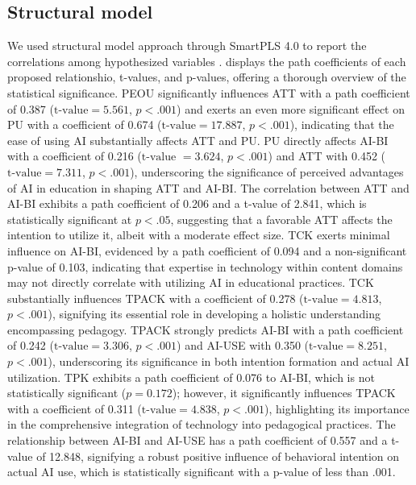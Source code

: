 \documentclass[english]{textolivre}
\begin{document}
\subsection{Structural model}\label{sec-outras-estr}
We used structural model approach through SmartPLS 4.0 to report the correlations among hypothesized variables \cite{cepeda2024plssem,hair2024plssem}.  displays the path coefficients of each proposed relationshio, t-values, and p-values, offering a thorough overview of the statistical significance. PEOU significantly influences ATT with a path coefficient of 0.387 ($\text{t-value} = 5.561$, $p < .001$) and exerts an even more significant effect on PU with a coefficient of 0.674 ($\text{t-value} = 17.887$, $p < .001$), indicating that the ease of using AI substantially affects ATT and PU. PU directly affects AI-BI with a coefficient of 0.216 ($\text{t-value }= 3.624$, $p < .001$) and ATT with 0.452 ($\text{t-value} = 7.311$, $p < .001$), underscoring the significance of perceived advantages of AI in education in shaping ATT and AI-BI. The correlation between ATT and AI-BI exhibits a path coefficient of 0.206 and a t-value of 2.841, which is statistically significant at $p < .05$, suggesting that a favorable ATT affects the intention to utilize it, albeit with a moderate effect size. TCK exerts minimal influence on AI-BI, evidenced by a path coefficient of 0.094 and a non-significant p-value of 0.103, indicating that expertise in technology within content domains may not directly correlate with utilizing AI in educational practices. TCK substantially influences TPACK with a coefficient of 0.278 ($\text{t-value} = 4.813$, $p < .001$), signifying its essential role in developing a holistic understanding encompassing pedagogy. TPACK strongly predicts AI-BI with a path coefficient of 0.242 ($\text{t-value} = 3.306$, $p < .001$) and AI-USE with 0.350 ($\text{t-value} = 8.251$, $p < .001$), underscoring its significance in both intention formation and actual AI utilization. TPK exhibits a path coefficient of 0.076 to AI-BI, which is not statistically significant ($p = 0.172$); however, it significantly influences TPACK with a coefficient of 0.311 ($\text{t-value} = 4.838$, $p < .001$), highlighting its importance in the comprehensive integration of technology into pedagogical practices. The relationship between AI-BI and AI-USE  has a path coefficient of 0.557 and a t-value of 12.848, signifying a robust positive influence of behavioral intention on actual AI use, which is statistically significant with a p-value of less than .001.
\end{document}
